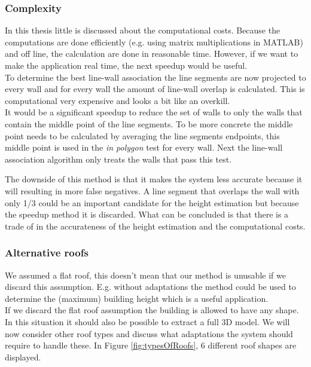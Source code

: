 \subsubsection{Complexity}
In this thesis little is discussed about the computational costs. Because the 
computations are done efficiently (e.g. using matrix multiplications
in MATLAB) and off line, the calculation are done in reasonable time.
However, if we want to make the application real time, the next speedup would be useful.\\
To determine the best line-wall association the line segments are now projected to
every wall and for every wall the amount of line-wall overlap is calculated. This
is computational very expensive and looks a bit like an overkill.\\

It would be a significant speedup to reduce the set of walls to only the walls
that contain the middle point of the line segments. To be more concrete the
middle point needs to be calculated by averaging the line segments endpoints,
this middle point is used in the \emph{in polygon} test for every wall.  Next the
line-wall association algorithm only treats the walls that pass this test.

The downside of this method is that it makes the system less accurate because it
will resulting in more false negatives. A line segment that overlaps the wall with only 1/3 could be an
important candidate for the height estimation but because the speedup method it is discarded.
What can be concluded is that there is a trade of in the accurateness of the
height estimation and the computational costs.


\subsubsection{Alternative roofs}

We assumed a flat roof, this doesn't mean that our method is unusable if
we discard this assumption.
E.g. without adaptations the method could be used to determine the (maximum)
building height which is a useful application.\\

If we discard the flat roof assumption the building is allowed to have any
shape. In this situation it should also be possible to extract a
full 3D model.  We will now consider other roof types and discuss what
adaptations the system should require to handle these.  In Figure
\ref{fig:typesOfRoofs}, 6 different roof shapes are displayed.\\

